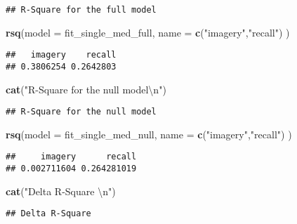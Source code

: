 \documentclass[11pt,]{article}
\newenvironment{Shaded}{\begin{snugshade}}{\end{snugshade}}
\newcommand{\CharTok}[1]{\textcolor[rgb]{0.31,0.60,0.02}{#1}}
\newcommand{\DataTypeTok}[1]{\textcolor[rgb]{0.13,0.29,0.53}{#1}}
\newcommand{\KeywordTok}[1]{\textcolor[rgb]{0.13,0.29,0.53}{\textbf{#1}}}
\newcommand{\NormalTok}[1]{#1}
\newcommand{\StringTok}[1]{\textcolor[rgb]{0.31,0.60,0.02}{#1}}
\begin{document}
\begin{verbatim}
## R-Square for the full model
\end{verbatim}

\begin{Shaded}
\begin{Highlighting}[]
\KeywordTok{rsq}\NormalTok{(}\DataTypeTok{model =}\NormalTok{ fit_single_med_full, }\DataTypeTok{name =} \KeywordTok{c}\NormalTok{(}\StringTok{"imagery"}\NormalTok{,}\StringTok{"recall"}\NormalTok{) )}
\end{Highlighting}
\end{Shaded}

\begin{verbatim}
##   imagery    recall 
## 0.3806254 0.2642803
\end{verbatim}

\begin{Shaded}
\begin{Highlighting}[]
\KeywordTok{cat}\NormalTok{(}\StringTok{"R-Square for the null model}\CharTok{\textbackslash{}n}\StringTok{"}\NormalTok{)}
\end{Highlighting}
\end{Shaded}

\begin{verbatim}
## R-Square for the null model
\end{verbatim}

\begin{Shaded}
\begin{Highlighting}[]
\KeywordTok{rsq}\NormalTok{(}\DataTypeTok{model =}\NormalTok{ fit_single_med_null, }\DataTypeTok{name =} \KeywordTok{c}\NormalTok{(}\StringTok{"imagery"}\NormalTok{,}\StringTok{"recall"}\NormalTok{) )}
\end{Highlighting}
\end{Shaded}

\begin{verbatim}
##     imagery      recall 
## 0.002711604 0.264281019
\end{verbatim}

\begin{Shaded}
\begin{Highlighting}[]
\KeywordTok{cat}\NormalTok{(}\StringTok{"Delta R-Square }\CharTok{\textbackslash{}n}\StringTok{"}\NormalTok{)}
\end{Highlighting}
\end{Shaded}

\begin{verbatim}
## Delta R-Square
\end{verbatim}
\end{document}
